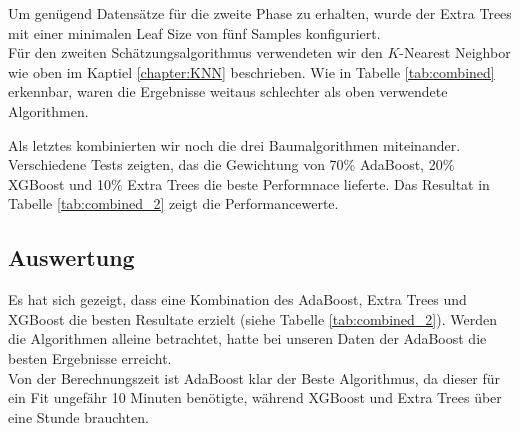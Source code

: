 Um genügend Datensätze für die zweite Phase zu erhalten, wurde der Extra Trees mit einer minimalen Leaf Size von fünf Samples konfiguriert.\\
Für den zweiten Schätzungsalgorithmus verwendeten wir den $K$-Nearest Neighbor wie oben im Kaptiel \ref{chapter:KNN} beschrieben. Wie in Tabelle \ref{tab:combined} erkennbar, waren die Ergebnisse weitaus schlechter als oben verwendete Algorithmen.

\begin{table}[ht]
\centering
{}
\caption{Ergebnisse eigenentwickelter Algorithmus}
\label{tab:combined}
\end{table}

Als letztes kombinierten wir noch die drei Baumalgorithmen miteinander. Verschiedene Tests zeigten, das die Gewichtung von 70\% AdaBoost, 20\% XGBoost und 10\% Extra Trees die beste Performnace lieferte.
Das Resultat in Tabelle \ref{tab:combined_2} zeigt die Performancewerte.

\begin{table}[ht]
\centering
{}
\caption{Kombination von AdaBoost, XGBoost und Extra Trees}
\label{tab:combined_2}
\end{table}

\subsection{Auswertung}
Es hat sich gezeigt, dass eine Kombination des AdaBoost, Extra Trees und XGBoost die besten Resultate erzielt (siehe Tabelle \ref{tab:combined_2}). Werden die Algorithmen alleine betrachtet, hatte bei unseren Daten der AdaBoost die besten Ergebnisse erreicht.\\
Von der Berechnungszeit ist AdaBoost klar der Beste Algorithmus, da dieser für ein Fit ungefähr 10 Minuten benötigte, während XGBoost und Extra Trees über eine Stunde brauchten.

